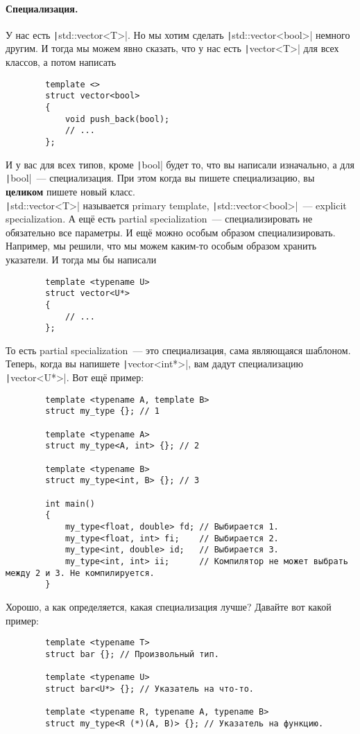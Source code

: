 \documentclass{article}
\begin{document}
    \paragraph{Специализация.}
    У нас есть \texttt|std::vector<T>|. Но мы хотим сделать \texttt|std::vector<bool>| немного другим. И тогда мы можем явно сказать, что у нас есть \texttt|vector<T>| для всех классов, а потом написать 
    \begin{verbatim}
        template <>
        struct vector<bool>
        {
            void push_back(bool);
            // ...
        };
    \end{verbatim}
    И у вас для всех типов, кроме \texttt|bool| будет то, что вы написали изначально, а для \texttt|bool|~--- специализация. При этом когда вы пишете специализацию, вы \textbf{целиком} пишете новый класс.\\
    \texttt|std::vector<T>| называется primary template, \texttt|std::vector<bool>|~--- explicit specialization. А ещё есть partial specialization~--- специализировать не обязательно все параметры. И ещё можно особым образом специализировать. Например, мы решили, что мы можем каким-то особым образом хранить указатели. И тогда мы бы написали
    \begin{verbatim}
        template <typename U>
        struct vector<U*>
        {
            // ...
        };
    \end{verbatim}
    То есть partial specialization~--- это специализация, сама являющаяся шаблоном. Теперь, когда вы напишете \texttt|vector<int*>|, вам дадут специализацию \texttt|vector<U*>|. Вот ещё пример:
    \begin{verbatim}
        template <typename A, template B>
        struct my_type {}; // 1

        template <typename A>
        struct my_type<A, int> {}; // 2

        template <typename B>
        struct my_type<int, B> {}; // 3

        int main()
        {
            my_type<float, double> fd; // Выбирается 1.
            my_type<float, int> fi;    // Выбирается 2.
            my_type<int, double> id;   // Выбирается 3.
            my_type<int, int> ii;      // Компилятор не может выбрать между 2 и 3. Не компилируется.
        }
    \end{verbatim}
    Хорошо, а как определяется, какая специализация лучше? Давайте вот какой пример:
    \begin{verbatim}
        template <typename T>
        struct bar {}; // Произвольный тип.
        
        template <typename U>
        struct bar<U*> {}; // Указатель на что-то.
        
        template <typename R, typename A, typename B>
        struct my_type<R (*)(A, B)> {}; // Указатель на функцию.
    \end{verbatim}
\end{document}
